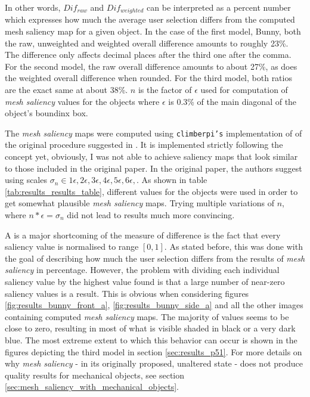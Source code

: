 In other words, $Dif_{raw}$ and $Dif_{weighted}$ can be interpreted as a percent number which expresses how much the average user selection differs from the computed mesh saliency map for a given object. In the case of the first model, Bunny, both the raw, unweighted and weighted overall difference amounts to roughly 23\%. The difference only affects decimal places after the third one after the comma. For the second model, the raw overall difference amounts to about 27\%, as does the weighted overall difference when rounded. For the third model, both ratios are the exact same at about 38\%. $n$ is the factor of $\epsilon$ used for computation of \textit{mesh saliency} values for the objects where $\epsilon$ is 0.3\% of the main diagonal of the object's boundinx box.

The \textit{mesh saliency} maps were computed using \texttt{climberpi's} implementation \cite{clms} of of the original procedure suggested in \cite{lee2005mesh}. It is implemented strictly following the concept yet, obviously, I was not able to achieve saliency maps that look similar to those included in the original paper. In the original paper, the authors suggest using scales $\sigma_{n} \in {1\epsilon, 2\epsilon, 3\epsilon, 4\epsilon, 5\epsilon, 6\epsilon, }$. As shown in table \ref{tab:results_results_table}, different values for the objects were used in order to get somewhat plausible \textit{mesh saliency} maps. Trying multiple variations of $n$, where $n*\epsilon = \sigma_{n}$ did not lead to results much more convincing.

A is a major shortcoming of the measure of difference is the fact that every saliency value is normalised to range $[0, 1]$. As stated before, this was done with the goal of describing how much the user selection differs from the results of \textit{mesh saliency} in percentage. However, the problem with dividing each individual saliency value by the highest value found is that a large number of near-zero saliency values is a result. This is obvious when considering figures \ref{fig:results_bunny_front_a}, \ref{fig:results_bunny_side_a} and all the other images containing computed \textit{mesh saliency} maps. The majority of values seems to be close to zero, resulting in most of what is visible shaded in black or a very dark blue. The most extreme extent to which this behavior can occur is shown in the figures depicting the third model in section \ref{sec:results_p51}. For more details on why \textit{mesh saliency} - in its originally proposed, unaltered state - does not produce quality results for mechanical objects, see section \ref{sec:mesh_saliency_with_mechanical_objects}.

